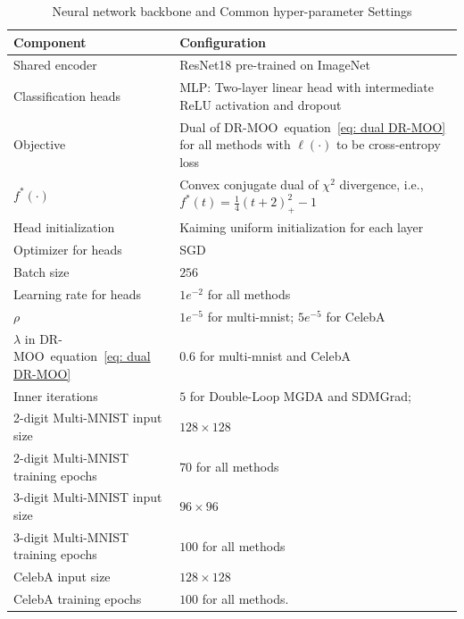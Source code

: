 \documentclass[twoside]{article} %
\def\eqref#1{equation~\ref{#1}}
\theoremstyle{plain}
\theoremstyle{definition}
\theoremstyle{remark}
\begin{document}
\begin{table}[ht]
\centering
\caption{Neural network backbone and Common hyper-parameter Settings}
\label{Table: backbone-training-config}
{
\scriptsize
\renewcommand{\arraystretch}{1.08}
\setlength{\tabcolsep}{1.5pt}
\begin{tabular*}{\textwidth}{
    @{\extracolsep{\fill}}
    ll
    @{}
}
\toprule
\textbf{Component} & \textbf{Configuration} \\
\midrule
Shared encoder & ResNet18 pre-trained on ImageNet~\citep{imageNet} \\
Classification heads & MLP:  Two-layer linear head with intermediate
ReLU activation and dropout \\
Objective & Dual of DR-MOO~\eqref{eq: dual DR-MOO} for all methods  with $\ell(\cdot)$ to be cross-entropy loss\\
$f^*(\cdot)$ & Convex conjugate dual of $\chi^2$ divergence, i.e., $f^*(t)=\frac{1}{4}(t+2)_{+}^2-1$ \\
Head initialization & Kaiming uniform initialization for each layer \\
Optimizer for heads & SGD \\
Batch size & $256$ \\
Learning rate for heads & $1e^{-2}$ for all methods \\
$\rho$ & $1e^{-5}$ for multi-mnist; $5e^{-5}$ for CelebA\\
$\lambda$ in DR-MOO~\eqref{eq: dual DR-MOO} & $0.6$ for multi-mnist and CelebA\\
Inner iterations & $5$ for Double-Loop MGDA and SDMGrad; \\
\midrule
2-digit Multi-MNIST input size & $128 \times 128$ \\
2-digit Multi-MNIST training epochs & $70$ for all methods \\
3-digit Multi-MNIST input size & $96 \times 96$ \\
3-digit Multi-MNIST training epochs & $100$ for all methods \\
CelebA input size & $128\times128$ \\
CelebA training epochs & $100$ for all methods.\\
\bottomrule
\end{tabular*}}
\end{table}
\end{document}
